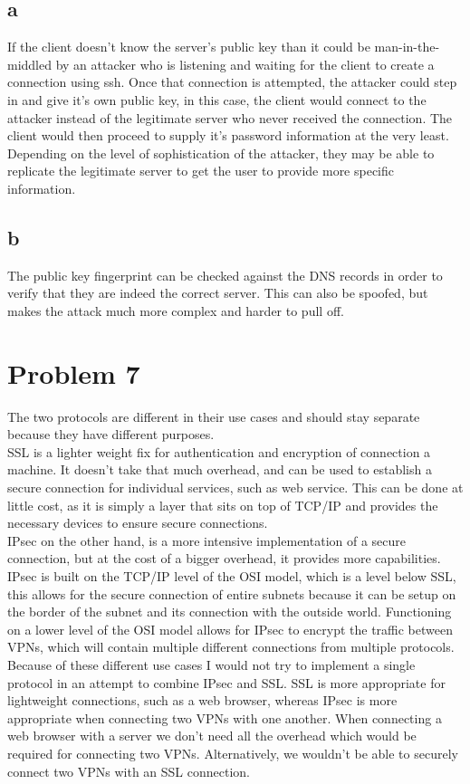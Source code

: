 \documentclass{article}
\begin{document}
\subsection*{a}
If the client doesn't know the server's public key than it could be man-in-the-middled by an attacker who is listening and waiting for the client to create a connection using ssh. Once that connection is attempted, the attacker could step in and give it's own public key, in this case, the client would connect to the attacker instead of the legitimate server who never received the connection. The client would then proceed to supply it's password information at the very least. Depending on the level of sophistication of the attacker, they may be able to replicate the legitimate server to get the user to provide more specific information.\\
\subsection*{b}
The public key fingerprint can be checked against the DNS records in order to verify that they are indeed the correct server. This can also be spoofed, but makes the attack much more complex and harder to pull off.\\

\section*{Problem 7}
The two protocols are different in their use cases and should stay separate because they have different purposes.\\
SSL is a lighter weight fix for authentication and encryption of connection a machine. It doesn't take that much overhead, and can be used to establish a secure connection for individual services, such as web service. This can be done at little cost, as it is simply a layer that sits on top of TCP/IP and provides the necessary devices to ensure secure connections.\\
IPsec on the other hand, is a more intensive implementation of a secure connection, but at the cost of a bigger overhead, it provides more capabilities. IPsec is built on the TCP/IP level of the OSI model, which is a level below SSL, this allows for the secure connection of entire subnets because it can be setup on the border of the subnet and its connection with the outside world. Functioning on a lower level of the OSI model allows for IPsec to encrypt the traffic between VPNs, which will contain multiple different connections from multiple protocols.\\
Because of these different use cases I would not try to implement a single protocol in an attempt to combine IPsec and SSL. SSL is more appropriate for lightweight connections, such as a web browser, whereas IPsec is more appropriate when connecting two VPNs with one another. When connecting a web browser with a server we don't need all the overhead which would be required for connecting two VPNs. Alternatively, we wouldn't be able to securely connect two VPNs with an SSL connection.\\
\end{document}
